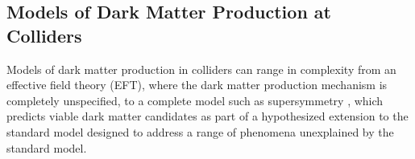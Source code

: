 \documentclass[12pt]{article}
\begin{document}
\subsection{Models of Dark Matter Production at Colliders}
Models of dark matter production in colliders can range in complexity from an effective field theory (EFT), where the dark matter production mechanism is completely unspecified, to a complete model such as supersymmetry \cite{susy_dm}, which predicts viable dark matter candidates as part of a hypothesized extension to the standard model designed to address a range of phenomena unexplained by the standard model. 

\end{document}
